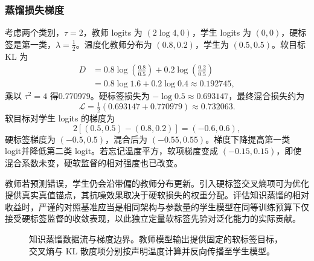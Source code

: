 \documentclass[../textbook.tex]{subfiles}
\begin{document}
\subsubsection{蒸馏损失梯度}
\begin{example}


考虑两个类别，$\tau=2$，教师 logits 为 $(2\log4,0)$，学生 logits 为 $(0,0)$，硬标签是第一类，$\lambda=\frac{1}{2}$。温度化教师分布为 $(0.8,0.2)$，学生为 $(0.5,0.5)$。软目标 KL 为
\begin{align*}
 D&=0.8\log(\frac{0.8}{0.5})+0.2\log(\frac{0.2}{0.5})\\
 &=0.8\log1.6+0.2\log0.4\approx0.192745,
\end{align*}
乘以 $\tau^2=4$ 得0.770979。硬标签损失为 $-\log0.5\approx0.693147$，最终混合损失约为
\begin{equation*}
 \mathcal L=\tfrac12(0.693147+0.770979)\approx0.732063.
\end{equation*}
软目标对学生 logits 的梯度为
\begin{equation*}
 2[(0.5,0.5)-(0.8,0.2)]=(-0.6,0.6),
\end{equation*}
硬标签梯度为 $(-0.5,0.5)$，混合后为 $(-0.55,0.55)$。梯度下降提高第一类 logit并降低第二类 logit。若忘记温度平方，软项梯度变成 $(-0.15,0.15)$，即使混合系数未变，硬软监督的相对强度也已改变。

教师若预测错误，学生仍会沿带偏的教师分布更新。引入硬标签交叉熵项可为优化提供真实真值锚点，其抗噪效果取决于硬软损失的权重分配。评估知识蒸馏的相对收益时，严谨的对照基准应当是相同架构与参数量的学生模型在同等训练预算下仅接受硬标签监督的收敛表现，以此独立定量软标签先验对泛化能力的实际贡献。

\begin{figure}[htbp]
\centering
{}
\caption[知识蒸馏数据流与梯度边界]{知识蒸馏数据流与梯度边界。教师模型输出提供固定的软标签目标，交叉熵与 KL 散度项分别按声明温度计算并反向传播至学生模型。}\label{fig:compress-kd}
\end{figure}
\end{example}
\end{document}
